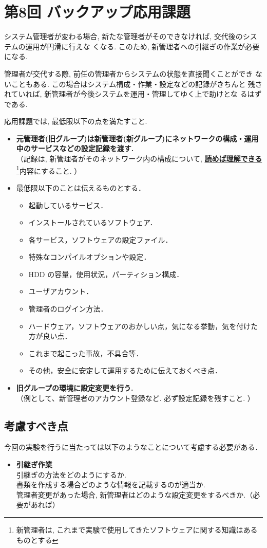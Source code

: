 \section{第8回 バックアップ応用課題}
システム管理者が変わる場合, 新たな管理者がその\textbf{}できなければ, 交代後のシステムの運用が円滑に行えな
くなる. このため, 新管理者への引継ぎの作業が必要になる.

管理者が交代する際, 前任の管理者からシステムの状態を直接聞くことができ
ないこともある. この場合はシステム構成・作業・設定などの記録がきちんと
残されていれば, 新管理者が今後システムを運用・管理してゆく上で助けとな
るはずである.

応用課題では, 最低限以下の点を満たすこと. 
\begin{itemize}
\item \textbf{元管理者(旧グループ)は新管理者(新グループ)にネットワークの構成・運用中のサービスなどの設定記録を渡す. }\\
  （記録は, 新管理者がそのネットワーク内の構成について, \underline{\textbf{読めば理解できる}}\footnote{新管理者は, これまで実験で使用してきたソフトウェアに関する知識はあるものとする}内容にすること. ）\\
\item 最低限以下のことは伝えるものとする．
  \begin{itemize}
  \item 起動しているサービス．
  \item インストールされているソフトウェア．
  \item 各サービス，ソフトウェアの設定ファイル．
  \item 特殊なコンパイルオプションや設定．
  \item HDD の容量，使用状況，パーティション構成．
  \item ユーザアカウント．
  \item 管理者のログイン方法．
  \item ハードウェア，ソフトウェアのおかしい点，気になる挙動，気を付けた方が良い点．
  \item これまで起こった事故，不具合等．
  \item その他，安全に安定して運用するために伝えておくべき点．
  \end{itemize}

  \item \textbf{旧グループの環境に設定変更を行う. }\\
	（例として、新管理者のアカウント登録など. 必ず設定記録を残すこと. ）\\
\end{itemize}

\subsection*{考慮すべき点}
今回の実験を行うに当たっては以下のようなことについて考慮する必要がある．
\begin{itemize}
  \item \textbf{引継ぎ作業}\\
         引継ぎの方法をどのようにするか. \\
         書類を作成する場合どのような情報を記載するのが適当か. \\
         管理者変更があった場合, 新管理者はどのような設定変更をするべきか.（必要があれば） \\
\end{itemize}
